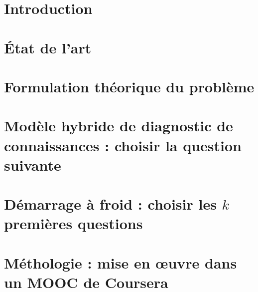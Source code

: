 \documentclass[a4paper,12pt,draft]{book}
\begin{document}
\tableofcontents

\chapter{Introduction}


\chapter{État de l'art}



\chapter{Formulation théorique du problème}


\chapter{Modèle hybride de diagnostic de connaissances : choisir la question suivante}



\chapter{Démarrage à froid : choisir les $k$ premières questions}


\chapter{Méthologie : mise en œuvre dans un MOOC de Coursera}

\end{document}
